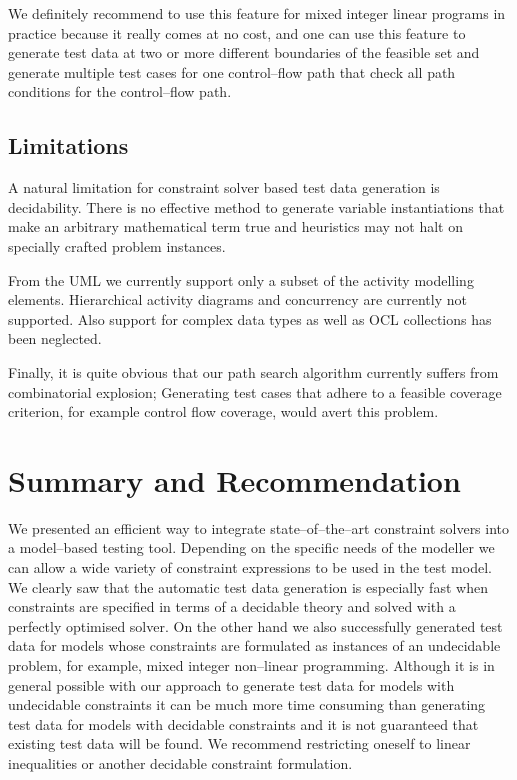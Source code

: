 \documentclass[runningheads,a4paper]{llncs}%
\begin{document}
We definitely recommend to use this feature for mixed integer linear programs in
practice because it really comes at no cost, and one can use this feature to
generate test data at two or more different boundaries of the feasible set and
generate multiple test cases for one control--flow path that check all path
conditions for the control--flow path.
\subsection{Limitations}
A natural limitation for constraint solver based test data generation is
decidability. There is no effective method to generate variable instantiations
that make an arbitrary mathematical term true and heuristics may not halt on
specially crafted problem instances.

From the UML we currently support only a subset of the activity modelling
elements. Hierarchical activity diagrams and concurrency are currently not
supported. Also support for complex data types as well as OCL collections has
been neglected.

Finally, it is quite obvious that our path search algorithm currently suffers
from combinatorial explosion; Generating test cases that adhere to a feasible
coverage criterion, for example control flow coverage, would avert this problem.
\section{Summary and Recommendation}%
\label{sec:Recommendation}%
We presented an efficient way to integrate state--of--the--art constraint
solvers into a model--based testing tool. Depending on the specific needs of the
modeller we can allow a wide variety of constraint expressions to be used in the
test model. We clearly saw that the automatic test data generation is especially
fast when constraints are specified in terms of a decidable theory and solved
with a perfectly optimised solver. On the other hand we also successfully
generated test data for models whose constraints are formulated as instances of
an undecidable problem, for example, mixed integer non--linear programming.
Although it is in general possible with our approach to generate test data for
models with undecidable constraints it can be much more time consuming than
generating test data for models with decidable constraints and it is not
guaranteed that existing test data will be found. We recommend restricting
oneself to linear inequalities or another decidable constraint formulation.
\end{document}
